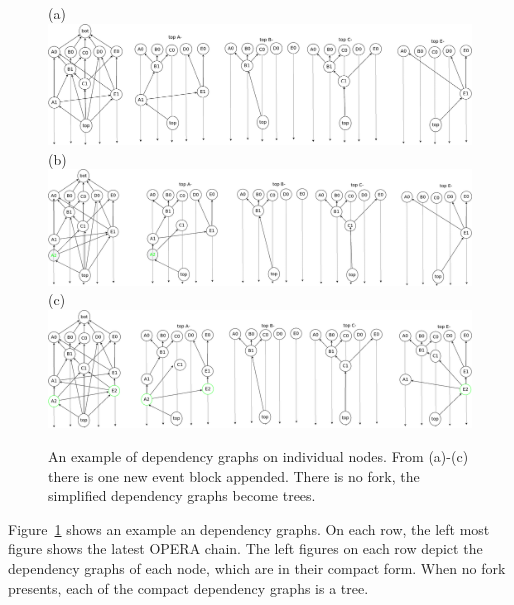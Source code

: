 \documentclass{article}
\begin{document}
\begin{figure}[H]
	\centering
	(a) \includegraphics[width=0.9\linewidth]{deptrees}  \\
	(b) \includegraphics[width=0.9\linewidth]{deptrees_mod_add1event} \\
	(c) \includegraphics[width=0.9\linewidth]{deptrees_mod_add2event}
	\caption{An example of dependency graphs on individual nodes. From (a)-(c) there is one new event block appended. There is no fork, the simplified dependency graphs become trees.}
	\label{fig:deptreesmod1}
\end{figure}

Figure~\ref{fig:deptreesmod1} shows an example an dependency graphs. On each row, the left most figure shows the latest OPERA chain. The left figures on each row depict the dependency graphs of each node, which are in their compact form. When no fork presents, each of the compact dependency graphs is a tree.

\newpage
\end{document}
